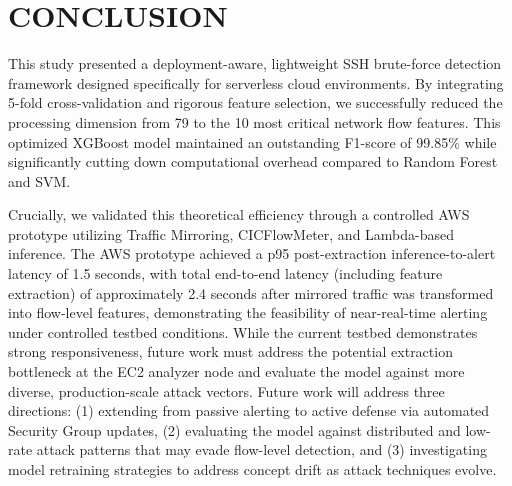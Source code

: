 \documentclass[conference]{IEEEtran}
\begin{document}
\section{CONCLUSION}

This study presented a deployment-aware, lightweight SSH brute-force detection framework designed specifically for serverless cloud environments. By integrating 5-fold cross-validation and rigorous feature selection, we successfully reduced the processing dimension from 79 to the 10 most critical network flow features. This optimized XGBoost model maintained an outstanding F1-score of 99.85\% while significantly cutting down computational overhead compared to Random Forest and SVM.

Crucially, we validated this theoretical efficiency through a controlled AWS prototype utilizing Traffic Mirroring, CICFlowMeter, and Lambda-based inference. The AWS prototype achieved a p95 post-extraction inference-to-alert latency of 1.5 seconds, with total end-to-end latency (including feature extraction) of approximately 2.4 seconds after mirrored traffic was transformed into flow-level features, demonstrating the feasibility of near-real-time alerting under controlled testbed conditions. While the current testbed demonstrates strong responsiveness, future work must address the potential extraction bottleneck at the EC2 analyzer node and evaluate the model against more diverse, production-scale attack vectors. Future work will address three directions: (1) extending from passive alerting to active defense via automated Security Group updates, (2) evaluating the model against distributed and low-rate attack patterns that may evade flow-level detection, and (3) investigating model retraining strategies to address concept drift as attack techniques evolve.

\balance
\end{document}
